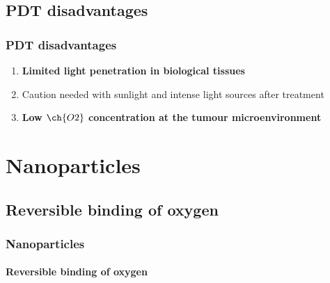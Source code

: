 \documentclass[aspectratio=169,fleqn,table]{beamer}
\begin{document}
\subsection{PDT disadvantages}
\begin{frame}
\frametitle{PDT disadvantages}

\begin{enumerate}
	\item\textbf{%
	Limited light penetration in biological tissues}
	\item
	Caution needed with sunlight and intense light sources after treatment
	\item\textbf{%
	Low $\ch{O2}$ concentration at the tumour microenvironment}
\end{enumerate}

\end{frame}




\section{Nanoparticles}


\subsection{Reversible binding of oxygen}
\begin{frame}
\frametitle{Nanoparticles}
\framesubtitle{Reversible binding of oxygen}

\vspace{-25pt}
\begin{figure}[border=1pt]
\end{figure}	

\end{frame}


\end{document}
